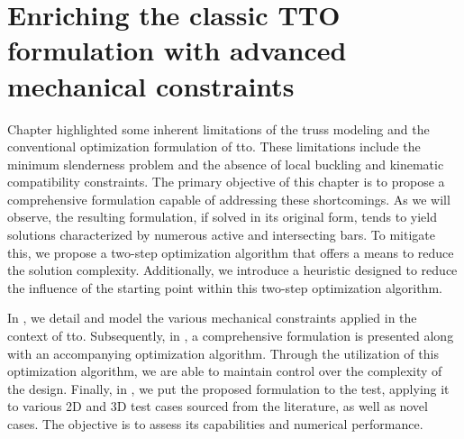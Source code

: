 \setchapterpreamble[u]{\margintoc}
\glsresetall %
\chapter{Enriching the classic TTO formulation with advanced mechanical constraints} \label{chp:04}
\label{chap:04}
Chapter \cite{chp:03} highlighted some inherent limitations of the truss modeling and the conventional optimization formulation of \gls{tto}. These limitations include the minimum slenderness problem and the absence of local buckling and kinematic compatibility constraints. The primary objective of this chapter is to propose a comprehensive formulation capable of addressing these shortcomings. As we will observe, the resulting formulation, if solved in its original form, tends to yield solutions characterized by numerous active and intersecting bars. To mitigate this, we propose a two-step optimization algorithm that offers a means to reduce the solution complexity. Additionally, we introduce a heuristic designed to reduce the influence of the starting point within this two-step optimization algorithm. 

In , we detail and model the various mechanical constraints applied in the context of \gls{tto}. Subsequently, in , a comprehensive formulation is presented along with an accompanying optimization algorithm. Through the utilization of this optimization algorithm, we are able to maintain control over the complexity of the design. Finally, in , we put the proposed formulation to the test, applying it to various 2D and 3D test cases sourced from the literature, as well as novel cases. The objective is to assess its capabilities and numerical performance.

